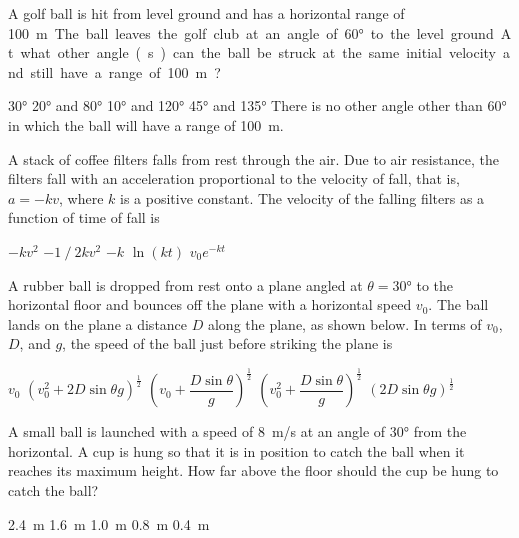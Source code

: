 \documentclass{../../../oss-classkick-exam}
\begin{document}
\begin{multicols*}{2}
\begin{questions}
    \question A golf ball is hit from level ground and has a horizontal range of
    \SI{100}\metre. The ball leaves the golf club at an angle of \ang{60} to
    the level ground. At what other angle(s) can the ball be struck at the same
    initial velocity and still have a range of \SI{100}{\metre}?
    \begin{choices}
      \choice\ang{30}
      \choice\ang{20} and \ang{80}
      \choice\ang{10} and \ang{120}
      \choice\ang{45} and \ang{135}
      \choice There is no other angle other than \ang{60} in which the ball will
      have a range of \SI{100}{\metre}.
    \end{choices}
    \vspace{.7in}

    \question A stack of coffee filters falls from rest through the air. Due to
    air resistance, the filters fall with an acceleration proportional to the
    velocity of fall, that is, $a=-kv$, where $k$ is a positive constant. The
    velocity of the falling filters as a function of time of fall is
    \begin{choices}
      \choice $-kv^2$
      \choice $-1⁄2kv^2$
      \choice $-k$
      \choice $\ln(kt)$
      \choice $v_0e^{-kt}$
    \end{choices}
    \columnbreak
    
    \question A rubber ball is dropped from rest onto a plane angled at
    $\theta=\ang{30}$ to the horizontal floor and bounces off the plane with a
    horizontal speed $v_0$. The ball lands on the plane a distance $D$ along the
    plane, as shown below. In terms of $v_0$, $D$, and $g$, the speed of the
    ball just before striking the plane is
    \begin{choices}
      \choice $v_0$
      \choice $\displaystyle\left(v_0^2+2D\sin\theta g\right)^{\frac12}$
      \choice $\left(v_0+\dfrac{D\sin\theta}{g}\right)^{\frac12}$
      \choice $\left(v_0^2+\dfrac{D\sin\theta}{g}\right)^{\frac12}$
      \choice $\displaystyle\left(2D\sin\theta g\right)^{\frac12}$
    \end{choices}
    \vspace{.7in}
  
    \question A small ball is launched with a speed of \SI{8}{m/s} at an angle
    of \ang{30} from the horizontal. A cup is hung so that it is in position to
    catch the ball when it reaches its maximum height. How far above the floor
    should the cup be hung to catch the ball?    
    \begin{choices}
      \choice\SI{2.4}{\metre}
      \choice\SI{1.6}{\metre}
      \choice\SI{1.0}{\metre}
      \choice\SI{.8}{\metre}
      \choice\SI{.4}{\metre}
    \end{choices}
  

\end{questions}
\end{multicols*}
\end{document}
